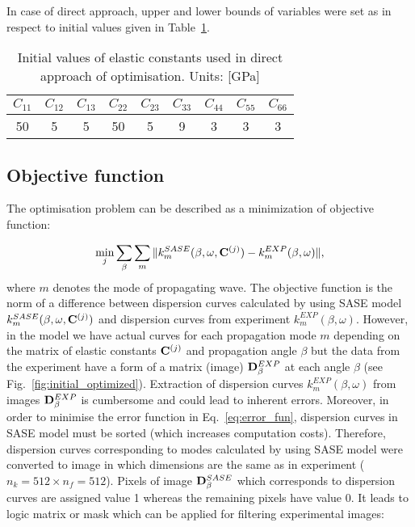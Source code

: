 	In case of direct approach, upper and lower bounds of variables were set as  
	 in respect to initial values given in Table~\ref{tab:Ctensor_initial}.
	
\begin{table}[h!]
\caption{Initial values of elastic constants used in direct approach of optimisation. Units: [GPa]}

		\renewcommand{\arraystretch}{1.3}
		\centering \footnotesize
		
		\begin{tabular}{ccccccccc} 
						\toprule
			\(C_{11}\) & \(C_{12}\) & \(C_{13}\)  & \(C_{22}\) & \(C_{23}\) & \(C_{33}\) & 
			\(C_{44}\)  & \(C_{55}\) & \(C_{66}\) \\
			\midrule
			50 &5& 5&  50 & 5 & 9 & 3 & 3 & 3\\
						\bottomrule 
		\end{tabular} 
		\label{tab:Ctensor_initial}
	
\end{table}

		
\subsection{Objective function}
		The optimisation problem can be described as a minimization of  objective function:
	
\begin{equation}
	\min_j \sum_{\beta}\sum_{m} \| k^{SASE}_{m}(\beta, \omega,\mathbf{C}^{(j)}) -k^{EXP}_{m}(\beta,\omega) \|,
\label{eq:error_fun}\end{equation}
	where \(m\) denotes the mode of propagating wave.
	The objective function is the norm of a difference between dispersion curves 
	calculated by using SASE model \(k^{SASE}_{m}(\beta, \omega,\mathbf{C}^{(j)})\) and 
	dispersion curves from experiment \(k^{EXP}_{m}(\beta,\omega)\). However, in the 
	model we have actual curves for each propagation mode \(m\) depending on the 
	matrix of elastic constants \(\mathbf{C}^{(j)}\) and propagation angle \(\beta\) but the 
	data 
	from the experiment have a form of a matrix (image) \(\mathbf{D}^{EXP}_{\beta}\) at 
	each angle \(\beta\) (see Fig.~\ref{fig:initial_optimized}). Extraction of dispersion 
	curves \(k^{EXP}_{m}(\beta,\omega)\) from images \(\mathbf{D}^{EXP}_{\beta}\) is 
	cumbersome and could lead to inherent errors. Moreover, in order to minimise the 
	error function in Eq.~\ref{eq:error_fun}, dispersion curves in SASE model must be 
	sorted (which increases computation costs). Therefore, dispersion curves 
	corresponding to  modes   
	calculated by using SASE model were converted to  image  
	 in which dimensions are the same as in  experiment 
	(\(n_k=512 \times n_f= 512\)). Pixels of  image \(\mathbf{D}^{SASE}_{\beta} \) 
	which corresponds to dispersion curves are assigned value 1 whereas the remaining 
	pixels have value 0. It leads to logic matrix or mask which can be applied for filtering 
	experimental images: 
	
